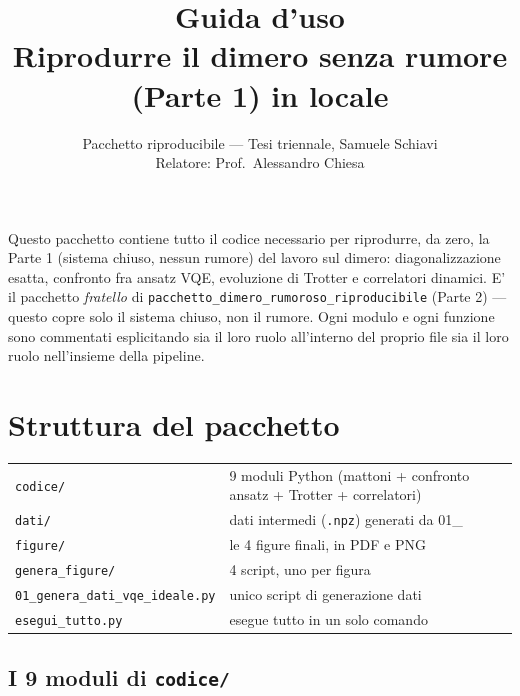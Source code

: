 \documentclass[11pt,a4paper]{article}
\title{\vspace{-1.5em}\color{inkblue}Guida d'uso\\[0.2em]
\Large\normalfont\color{softgray}Riprodurre il dimero senza rumore (Parte 1) in locale}
\author{Pacchetto riproducibile --- Tesi triennale, Samuele Schiavi\\ Relatore: Prof.\ Alessandro Chiesa}
\date{}
\newcommand{\code}[1]{\texttt{\small #1}}
\begin{document}
\sloppy
\maketitle
\thispagestyle{fancy}
\vspace{-2.0em}

Questo pacchetto contiene tutto il codice necessario per riprodurre, da
zero, la Parte 1 (sistema chiuso, nessun rumore) del lavoro sul dimero:
diagonalizzazione esatta, confronto fra ansatz VQE, evoluzione di
Trotter e correlatori dinamici. E' il pacchetto \emph{fratello} di
\code{pacchetto\_dimero\_rumoroso\_riproducibile} (Parte 2) --- questo
copre solo il sistema chiuso, non il rumore. Ogni modulo e ogni funzione
sono commentati esplicitando sia il loro ruolo all'interno del proprio
file sia il loro ruolo nell'insieme della pipeline.

\tableofcontents

\section{Struttura del pacchetto}

\begin{keyeq}
\centering
\begin{tabular}{@{}lp{9.5cm}@{}}
\code{codice/} & 9 moduli Python (mattoni + confronto ansatz + Trotter + correlatori)\\
\code{dati/} & dati intermedi (\code{.npz}) generati da 01\_\\
\code{figure/} & le 4 figure finali, in PDF e PNG\\
\code{genera\_figure/} & 4 script, uno per figura\\
\code{01\_genera\_dati\_vqe\_ideale.py} & unico script di generazione dati\\
\code{esegui\_tutto.py} & esegue tutto in un solo comando\\
\end{tabular}
\end{keyeq}

\subsection{I 9 moduli di \texttt{codice/}}
\end{document}
